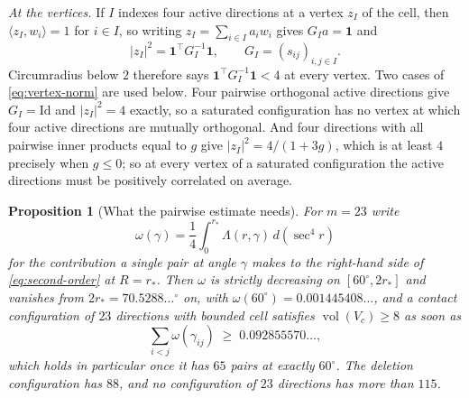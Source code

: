 \documentclass[11pt,reqno]{amsart}
\renewcommand{\_}{\origunderscore\allowbreak}
\numberwithin{equation}{section}
\theoremstyle{plain}
\newtheorem{prop}[thm]{Proposition}
\theoremstyle{definition}
\theoremstyle{remark}
\DeclareMathOperator{\vol}{vol}
\begin{document}
\emph{At the vertices.} If $I$ indexes four active directions at a
vertex $z_I$ of the cell, then $\langle z_I,w_i\rangle=1$ for $i\in I$,
so writing $z_I=\sum_{i\in I}a_iw_i$ gives $G_Ia=\mathbf1$ and
\begin{equation}\label{eq:vertex-norm}
  |z_I|^2=\mathbf1^{\top}G_I^{-1}\mathbf1 ,
  \qquad G_I=(s_{ij})_{i,j\in I}.
\end{equation}
Circumradius below $2$ therefore says
$\mathbf1^{\top}G_I^{-1}\mathbf1<4$ at every vertex. Two cases of
\eqref{eq:vertex-norm} are used below. Four pairwise orthogonal
active directions give $G_I=\mathrm{Id}$ and $|z_I|^2=4$ exactly, so a
saturated configuration has no vertex at which four active directions
are mutually orthogonal. And four directions with all pairwise inner
products equal to $g$ give $|z_I|^2=4/(1+3g)$, which is at least $4$
precisely when $g\le0$; so at every vertex of a saturated configuration
the active directions must be positively correlated on average.

\begin{prop}[What the pairwise estimate needs]\label{prop:pair-budget}
For $m=23$ write
\[
  \omega(\gamma)=\frac14\int_0^{r_*}\Lambda(r,\gamma)\,d(\sec^4r)
\]
for the contribution a single pair at angle $\gamma$ makes to the
right-hand side of \eqref{eq:second-order} at $R=r_*$. Then $\omega$ is
strictly decreasing on $[60^\circ,2r_*]$ and vanishes from
$2r_*=70.5288\ldots^\circ$ on, with
$\omega(60^\circ)=0.001445408\ldots$, and a contact configuration of
$23$ directions with bounded cell satisfies $\vol(V_c)\ge8$ as soon as
\begin{equation}\label{eq:pair-budget}
  \sum_{i<j}\omega(\gamma_{ij})\;\ge\;0.092855570\ldots ,
\end{equation}
which holds in particular once it has $65$ pairs at exactly $60^\circ$.
The deletion configuration has $88$, and no configuration of $23$
directions has more than $115$.
\end{prop}
\end{document}
